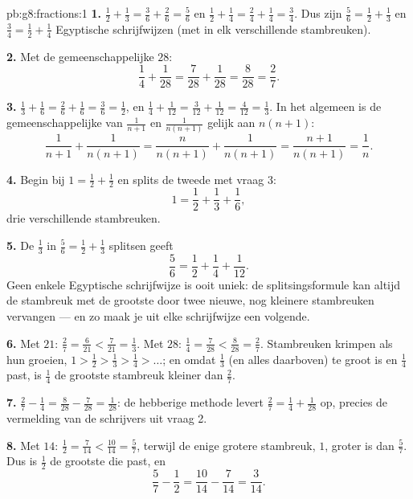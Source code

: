 \begin{solution}{pb:g8:fractions:1}
\textbf{1.} $\frac12 + \frac13 = \frac36 + \frac26 = \frac56$ en
$\frac12 + \frac14 = \frac24 + \frac14 = \frac34$. Dus zijn
$\frac56 = \frac12 + \frac13$ en $\frac34 = \frac12 + \frac14$ Egyptische
schrijfwijzen (met in elk verschillende stambreuken).

\textbf{2.} Met de gemeenschappelijke  $28$:
\[
\frac14 + \frac{1}{28} = \frac{7}{28} + \frac{1}{28}
= \frac{8}{28} = \frac{2}{7} .
\]

\textbf{3.} $\frac13 + \frac16 = \frac26 + \frac16 = \frac36 = \frac12$, en
$\frac14 + \frac{1}{12} = \frac{3}{12} + \frac{1}{12} = \frac{4}{12} = \frac13$. In
het algemeen is de gemeenschappelijke  van $\frac{1}{n+1}$ en
$\frac{1}{n(n+1)}$ gelijk aan $n(n+1)$:
\[
\frac{1}{n+1} + \frac{1}{n(n+1)}
= \frac{n}{n(n+1)} + \frac{1}{n(n+1)}
= \frac{n+1}{n(n+1)}
= \frac{1}{n} .
\]

\textbf{4.} Begin bij $1 = \frac12 + \frac12$ en splits de tweede  met vraag 3:
\[
1 = \frac12 + \frac13 + \frac16 ,
\]
drie verschillende stambreuken.

\textbf{5.} De $\frac13$ in $\frac56 = \frac12 + \frac13$ splitsen geeft
\[
\frac56 = \frac12 + \frac14 + \frac{1}{12} .
\]
Geen enkele Egyptische schrijfwijze is ooit uniek: de splitsingsformule kan altijd de
stambreuk met de grootste  door twee nieuwe, nog kleinere stambreuken vervangen
--- en zo maak je uit elke schrijfwijze een volgende.

\textbf{6.} Met  $21$: $\frac27 = \frac{6}{21} < \frac{7}{21} = \frac13$. Met
 $28$: $\frac14 = \frac{7}{28} < \frac{8}{28} = \frac27$. Stambreuken krimpen
als hun  groeien, $1 > \frac12 > \frac13 > \frac14 > \dots$; en omdat $\frac13$
(en alles daarboven) te groot is en $\frac14$ past, is $\frac14$ de grootste stambreuk
kleiner dan $\frac27$.

\textbf{7.} $\frac27 - \frac14 = \frac{8}{28} - \frac{7}{28} = \frac{1}{28}$: de
hebberige methode levert $\frac27 = \frac14 + \frac{1}{28}$ op, precies de vermelding
van de schrijvers uit vraag 2.

\textbf{8.} Met  $14$: $\frac12 = \frac{7}{14} < \frac{10}{14} = \frac57$,
terwijl de enige grotere stambreuk, $1$, groter is dan $\frac57$. Dus is $\frac12$ de
grootste die past, en
\[
\frac57 - \frac12 = \frac{10}{14} - \frac{7}{14} = \frac{3}{14} .
\]


\end{solution}
